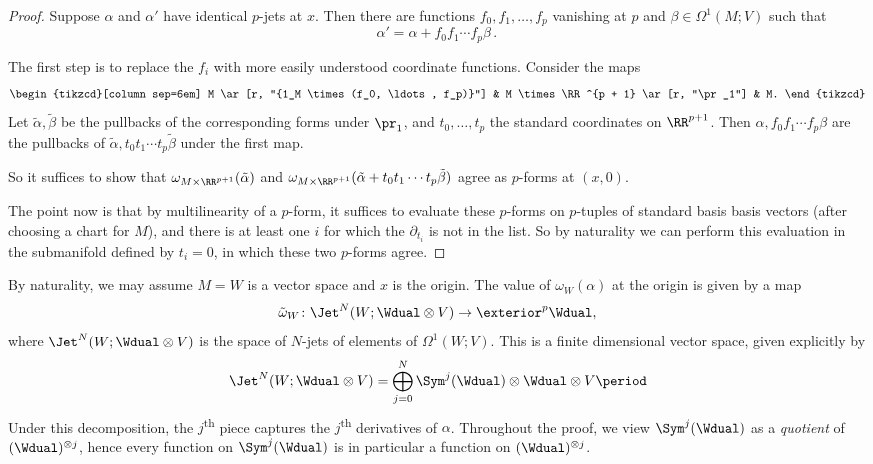 \begin{proof}
  Suppose $\alpha$ and $\alpha'$ have identical $p$-jets at $x$. Then there are functions $f_0, f_1, \ldots, f_p$ vanishing at $p$ and $\beta \in \Omega^1(M; V)$ such that
  \begin{equation*}
    \alpha' = \alpha + f_0 f_1 \cdots f_p \beta\period
  \end{equation*}

  The first step is to replace the $f_i$ with more easily understood coordinate functions. Consider the maps
    \begin{equation*}
      \begin{tikzcd}[column sep=6em]
        M \ar[r, "{1_M \times (f_0, \ldots, f_p)}"] & M \times \RR ^{p + 1} \ar[r, "\pr_1"] & M.
      \end{tikzcd}
    \end{equation*}
  Let $\tilde{\alpha}, \tilde{\beta}$ be the pullbacks of the corresponding forms under $\pr_1$, and $t_0, \ldots, t_p$ the standard coordinates on $\RR ^{p + 1}$. Then $\alpha, f_0 f_1\cdots f_p \beta$ are the pullbacks of $\tilde{\alpha}, t_0 t_1\cdots t_p \tilde{\beta}$ under the first map.

  So it suffices to show that $\omega_{M \times \RR ^{p + 1}}(\tilde{\alpha})$ and $\omega_{M \times \RR ^{p + 1}}(\tilde{\alpha} + t_0 t_1 \cdots t_p \tilde{\beta})$ agree as $p$-forms at $(x, 0)$.

  The point now is that by multilinearity of a $p$-form, it suffices to evaluate these $p$-forms on $p$-tuples of standard basis basis vectors (after choosing a chart for $M$), and there is at least one $i$ for which the $\partial_{t_i}$ is not in the list. So by naturality we can perform this evaluation in the submanifold defined by $t_i = 0$, in which these two $p$-forms agree. 
\end{proof}

By naturality, we may assume $M = W$ is a vector space and $x$ is the origin. The value of $\omega_W(\alpha)$ at the origin is given by a map
\begin{equation*}
  \tilde{\omega}_W\colon \Jet^N(W; \Wdual \otimes V) \to \exterior^p \Wdual,
\end{equation*}
where $\Jet^N(W; \Wdual \otimes V)$ is the space of $N$-jets of elements of $\Omega^1(W; V)$. This is a finite dimensional vector space, given explicitly by
\begin{equation*}
  \Jet^N(W; \Wdual \otimes V) = \bigoplus_{j = 0}^N \Sym^j(\Wdual) \otimes \Wdual \otimes V \period
\end{equation*}
Under this decomposition, the $j$\textsuperscript{th} piece captures the $j$\textsuperscript{th} derivatives of $\alpha$. 
Throughout the proof, we view $\Sym^j(\Wdual)$ as a \emph{quotient} of $(\Wdual)^{\otimes j}$, hence every function on $\Sym^j(\Wdual)$ is in particular a function on $(\Wdual)^{\otimes j}$.

